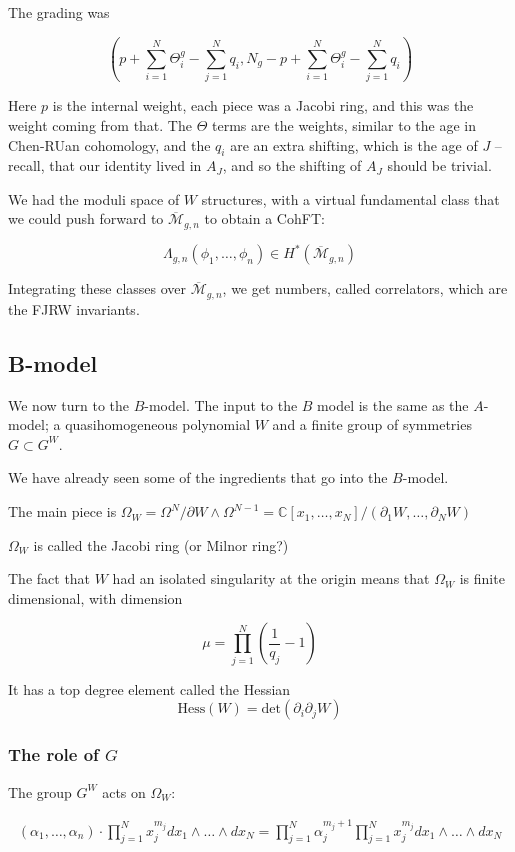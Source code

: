 \documentclass{amsart}
\theoremstyle{definition}
\newcommand{\Mbar}{\overline{\mathcal{M}}}
\newcommand{\C}{\mathbb{C}}
\begin{document}
The grading was

$$(p+\sum_{i=1}^N \Theta_i^g-\sum_{j=1}^N q_i, N_g-p+\sum_{i=1}^N \Theta_i^g-\sum_{j=1}^N q_i)$$

Here $p$ is the internal weight, each piece was a Jacobi ring, and this was the weight coming from that.  The $\Theta$ terms are the weights, similar to the age in Chen-RUan cohomology, and the $q_i$ are an extra shifting, which is the age of $J$ -- recall, that our identity lived in $A_J$, and so the shifting of $A_J$ should be trivial.

We had the moduli space of $W$ structures, with a virtual fundamental class that we could push forward to $\Mbar_{g,n}$ to obtain a CohFT:

$$\Lambda_{g,n}(\phi_1,\dots,\phi_n)\in H^*(\Mbar_{g,n})$$

Integrating these classes over $\Mbar_{g,n}$, we get numbers, called correlators, which are the FJRW invariants.

\subsection{B-model}

We now turn to the $B$-model.  The input to the $B$ model is the same as the $A$-model; a quasihomogeneous polynomial $W$ and a finite group of symmetries $G\subset G^W$.



We have already seen some of the ingredients that go into the $B$-model.

The main piece is $\Omega_W=\Omega^N/\partial W\wedge \Omega^{N-1}=\C[x_1,\dots, x_N]/(\partial_1 W,\dots, \partial_N W)$

$\Omega_W$ is called the Jacobi ring (or Milnor ring?)

The fact that $W$ had an isolated singularity at the origin means that $\Omega_W$ is finite dimensional, with dimension

$$\mu=\prod_{j=1}^N (\frac{1}{q_j}-1)$$



It has a top degree element called the Hessian 
$$\text{Hess}(W)=\text{det}\left(\partial_i\partial_j W\right)$$

\subsubsection{The role of $G$}
The group $G^W$ acts on $\Omega_W$:

\begin{align*}
(\alpha_1,\dots,\alpha_n)\cdot\prod_{j=1}^N x_j^{m_j}dx_1\wedge\dots\wedge dx_N
=\prod_{j=1}^N \alpha_j^{m_j+1}\prod_{j=1}^N x_j^{m_j}dx_1\wedge\dots\wedge dx_N
\end{align*}
\end{document}
